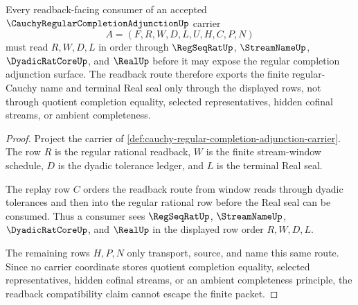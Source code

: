 \begin{theorem}
\label{thm:regular-cauchy-completion-adjunction-readback-compatibility}
Every readback-facing consumer of an accepted $\CauchyRegularCompletionAdjunctionUp$ carrier
$$
A=(F,R,W,D,L,U,H,C,P,N)
$$
must read $R,W,D,L$ in order through $\RegSeqRatUp$, $\StreamNameUp$, $\DyadicRatCoreUp$, and $\RealUp$ before it may expose the regular completion adjunction surface. The readback route therefore exports the finite regular-Cauchy name and terminal Real seal only through the displayed rows, not through quotient completion equality, selected representatives, hidden cofinal streams, or ambient completeness.
\end{theorem}
\begin{proof}
Project the carrier of \autoref{def:cauchy-regular-completion-adjunction-carrier}. The row $R$ is the regular rational readback, $W$ is the finite stream-window schedule, $D$ is the dyadic tolerance ledger, and $L$ is the terminal Real seal.

The replay row $C$ orders the readback route from window reads through dyadic tolerances and then into the regular rational row before the Real seal can be consumed. Thus a consumer sees $\RegSeqRatUp$, $\StreamNameUp$, $\DyadicRatCoreUp$, and $\RealUp$ in the displayed row order $R,W,D,L$.

The remaining rows $H,P,N$ only transport, source, and name this same route. Since no carrier coordinate stores quotient completion equality, selected representatives, hidden cofinal streams, or an ambient completeness principle, the readback compatibility claim cannot escape the finite packet.
\end{proof}

